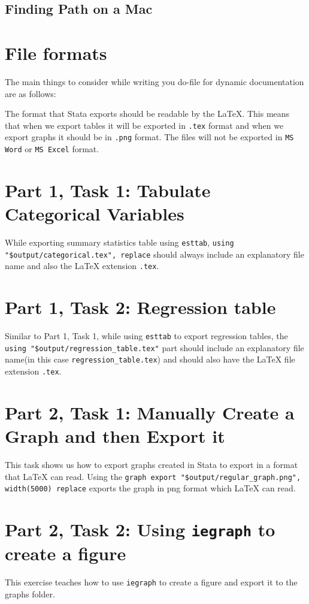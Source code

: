 \documentclass[]{article}
\begin{document}
\subsection*{Finding Path on a Mac}


\section*{File formats}
The main things to consider while writing you do-file for dynamic documentation are as follows: 

The format that Stata exports should be readable by the {\LaTeX}. This means that when we export tables it will be exported in \texttt{.tex} format and when we export graphs it should be in \texttt{.png} format. 
The files will not be exported in \texttt{MS Word} or \texttt{MS Excel} format.

\section*{Part 1, Task 1: Tabulate Categorical Variables}

While exporting summary statistics table using \texttt{esttab}, \verb|using 	"$output/categorical.tex", replace| should always include an explanatory file name and also the {\LaTeX} extension \texttt{.tex}.

\section*{Part 1, Task 2: Regression table}

Similar to Part 1, Task 1, while using \texttt{esttab} to export regression tables, the \verb|using "$output/regression_table.tex"| part should include an explanatory file name(in this case \texttt{regression\_table.tex}) and should also have the {\LaTeX} file extension \texttt{.tex}.

\section*{Part 2, Task 1: Manually Create a Graph and then Export it}

This task shows us how to export graphs created in Stata to export in a format that {\LaTeX} can read. Using the \verb|graph export "$output/regular_graph.png", width(5000) replace| 
exports the graph in png format which {\LaTeX} can read. 
\section*{Part 2, Task 2: Using \texttt{iegraph} to create a figure}
This exercise teaches how to use \texttt{iegraph} to create a figure and export it to the graphs folder. \\
\end{document}
